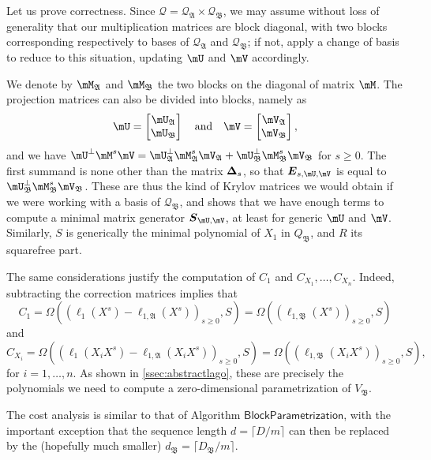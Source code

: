 \documentclass[12pt]{article}
\newcommand{\mat}[1]{\bm{\MakeUppercase{#1}}} %
\newcommand{\mainalgoname}{\mathsf{ BlockParametrization}}
\newcommand{\lf}{X}
\newcommand{\residueI}{\mathscr{Q}}
\begin{document}
Let us prove correctness. Since $\residueI=\residueI_\mathfrak{A}
\times \residueI_\mathfrak{B}$, we may assume without loss of
generality that our multiplication matrices are block diagonal, with
two blocks corresponding respectively to bases of $\residueI_\mathfrak{A}$
and $\residueI_\mathfrak{B}$; if not, apply a change of basis to 
reduce to this situation, updating $\mU$ and $\mV$ accordingly. 

We denote by $\mM_\mathfrak{A}$ and $\mM_\mathfrak{B}$ the 
two blocks on the diagonal of matrix $\mM$.
The projection matrices can also be divided into blocks, namely as
$$\mU = \left [\begin{matrix}\mU_\mathfrak{A} \\\mU_\mathfrak{B}
  \end{matrix}\right ] \quad\text{and}\quad
\mV = \left [\begin{matrix}\mV_\mathfrak{A} \\\mV_\mathfrak{B}
  \end{matrix}\right ],$$
and we have $\mU^\perp \mM^s \mV = \mU_\mathfrak{A}^\perp
\mM_\mathfrak{A}^s \mV_\mathfrak{A} + \mU_\mathfrak{B}^\perp
\mM_\mathfrak{B}^s \mV_\mathfrak{B}$ for $s \ge 0$. The first summand
is none other than the matrix $\mat{\Delta}_s$, so that
$\mat{E}_{s,\mU,\mV}$ is equal to $\mU_\mathfrak{B}^\perp
\mM_\mathfrak{B}^s \mV_\mathfrak{B}$. These are thus the kind of
Krylov matrices we would obtain if we were working with a basis of
$\residueI_\mathfrak{B}$, and shows that we have enough
terms to compute a minimal matrix generator
$\mat{S}_{\mU,\mV}$, at least for generic $\mU$ and $\mV$. 
Similarly, $S$ is generically the minimal polynomial of $X_1$ in
$Q_\mathfrak{B}$, and $R$ its squarefree part.

The same considerations justify the computation of $C_1$ and
$C_{X_1},\dots,C_{X_n}$. Indeed, subtracting the correction matrices
implies that 
$$C_1 = \Omega( (\ell_1(\lf^s)-\ell_{1,\mathfrak{A}}(\lf^s))_{s \ge 0}, S) =  \Omega( (\ell_{1,\mathfrak{B}}(\lf^s))_{s \ge 0}, S)$$
and
$$C_{X_i} = \Omega( (\ell_1(X_i \lf^s)-\ell_{1,\mathfrak{A}}(X_i \lf^s))_{s \ge 0}, S) =  \Omega( (\ell_{1,\mathfrak{B}}(X_i\lf^s))_{s \ge 0}, S),$$
for $i=1,\dots,n$. As shown in \cref{ssec:abstractlago}, these are precisely 
the polynomials we need to compute a zero-dimensional parametrization
of $V_\mathfrak{B}$.

The cost analysis is similar to that of Algorithm $\mainalgoname$,
with the important exception that the sequence length $d=\lceil
D/m\rceil$ can then be replaced by the (hopefully much smaller)
$d_\mathfrak{B}=\lceil D_\mathfrak{B}/m\rceil$.
\end{document}
